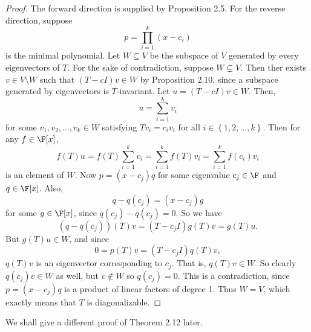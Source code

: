 \documentclass[linearalgebraII]{subfiles}
\begin{document}
    \begin{proof}
        The forward direction is supplied by Proposition 2.5. For the reverse direction, suppose
        \begin{equation*}
            p = \prod^{k}_{i=1} \left( x-c_i \right) 
        \end{equation*}
        is the minimal polynomial. Let $W\subseteq V$ be the subspace of $V$ generated by every eigenvectors of $T$. For the sake of contradiction, suppose $W\subsetneq V$. Then ther exists $v\in V\setminus W$ such that $(T-cI)v\in W$ by Proposition 2.10, since a subspace generated by eigenvectors is $T$-invariant. Let $u = \left( T - cI \right)v\in W$. Then,
        \begin{equation*}
            u = \sum^{k}_{i=1} v_i
        \end{equation*}
        for some $v_1, v_2, \ldots, v_k\in W$ satisfying $Tv_i = c_iv_i$ for all $i\in \left\lbrace 1, 2, \ldots, k \right\rbrace$. Then for any $f\in \F[x]$,
        \begin{equation*}
            f(T)u = f(T) \sum^{k}_{i=1} v_i = \sum^{k}_{i=1} f(T)v_i = \sum^{k}_{i=1} f(c_i)v_i
        \end{equation*}
        is an element of $W$. Now $p = (x-c_j)q$ for some eigenvalue $c_j\in\F$ and $q\in \F[x]$. Also,
        \begin{equation*}
            q - q(c_j) = (x-c_j)g
        \end{equation*}
        for some $g\in\F[x]$, since $q(c_j) - q(c_j) = 0$. So we have
        \begin{equation*}
            \left( q -q(c_j) \right)(T)v = \left( T-c_jI \right) g(T)v = g(T)u.
        \end{equation*}
        But $g(T)u\in W$, and since
        \begin{equation*}
            0 = p(T)v = (T-c_jI)q(T)v,
        \end{equation*}
        $q(T)v$ is an eigenvector corresponding to $c_j$. That is, $q(T)v\in W$. So clearly $q(c_j)v\in W$ as well, but $v\notin W$ so $q(c_j) = 0$. This is a contradiction, since $p = (x-c_j)q$ is a product of linear factors of degree 1. Thus $W=V$, which exactly means that $T$ is diagonalizable.
    \end{proof}

    \begin{remark}
        We shall give a different proof of Theorem 2.12 later. 
    \end{remark}
\end{document}
